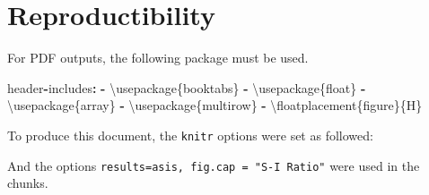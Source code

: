 \documentclass[
]{article}
\newenvironment{Shaded}{\begin{snugshade}}{\end{snugshade}}
\newcommand{\AttributeTok}[1]{\textcolor[rgb]{0.13,0.29,0.53}{#1}}
\newcommand{\ConstantTok}[1]{\textcolor[rgb]{0.56,0.35,0.01}{#1}}
\newcommand{\FunctionTok}[1]{\textcolor[rgb]{0.13,0.29,0.53}{\textbf{#1}}}
\newcommand{\NormalTok}[1]{#1}
\newcommand{\SpecialCharTok}[1]{\textcolor[rgb]{0.81,0.36,0.00}{\textbf{#1}}}
\newcommand{\StringTok}[1]{\textcolor[rgb]{0.31,0.60,0.02}{#1}}
\begin{document}
\section{Reproductibility}\label{reproductibility}

For PDF outputs, the following package must be used.

\begin{Shaded}
\begin{Highlighting}[]
\NormalTok{header}\SpecialCharTok{{-}}\NormalTok{includes}\SpecialCharTok{:}
   \SpecialCharTok{{-}}\NormalTok{ \textbackslash{}usepackage\{booktabs\}}
   \SpecialCharTok{{-}}\NormalTok{ \textbackslash{}usepackage\{float\}}
   \SpecialCharTok{{-}}\NormalTok{ \textbackslash{}usepackage\{array\}}
   \SpecialCharTok{{-}}\NormalTok{ \textbackslash{}usepackage\{multirow\}}
   \SpecialCharTok{{-}}\NormalTok{ \textbackslash{}floatplacement\{figure\}\{H\}}
\end{Highlighting}
\end{Shaded}

To produce this document, the \texttt{knitr} options were set as
followed:

\begin{Shaded}
\end{Shaded}

And the options
\texttt{results=\textquotesingle{}asis\textquotesingle{},\ fig.cap\ =\ "S-I\ Ratio"}
were used in the chunks.
\end{document}
